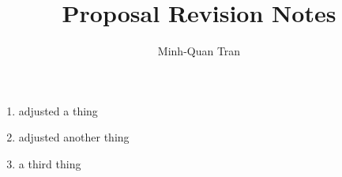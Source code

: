 \documentclass[12pt]{article}
\title{Proposal Revision Notes}
\author{Minh-Quan Tran}
\begin{document}
\maketitle

%
%
\begin{enumerate}

\item{adjusted a thing}

\item{adjusted another thing}

\item{a third thing}

\end{enumerate}
\end{document}
